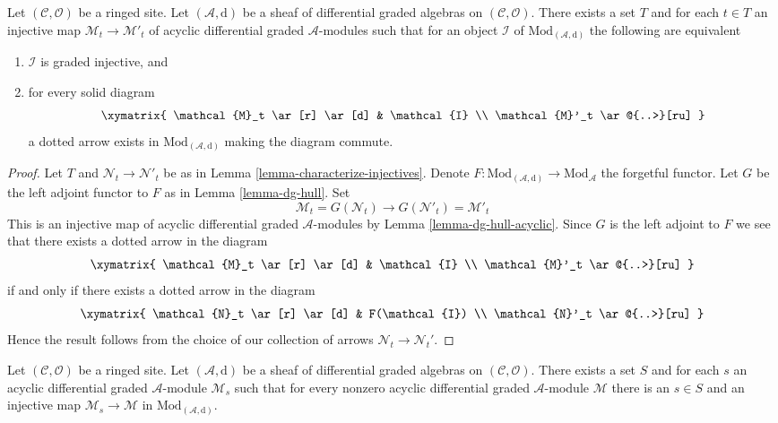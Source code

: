 \begin{lemma}
\label{lemma-characterize-graded-injectives-in-dg}
Let $(\mathcal{C}, \mathcal{O})$ be a ringed site.
Let $(\mathcal{A}, \text{d})$
be a sheaf of differential graded algebras on $(\mathcal{C}, \mathcal{O})$.
There exists a set $T$ and for each $t \in T$ an injective map
$\mathcal{M}_t \to \mathcal{M}'_t$ of
acyclic differential graded $\mathcal{A}$-modules
such that for an object $\mathcal{I}$ of $\text{Mod}_{(\mathcal{A}, \text{d})}$
the following are equivalent
\begin{enumerate}
\item $\mathcal{I}$ is graded injective, and
\item for every solid diagram
$$
\xymatrix{
\mathcal{M}_t \ar[r] \ar[d] & \mathcal{I} \\
\mathcal{M}'_t \ar@{..>}[ru]
}
$$
a dotted arrow exists in $\text{Mod}_{(\mathcal{A}, \text{d})}$
making the diagram commute.
\end{enumerate}
\end{lemma}

\begin{proof}
Let $T$ and $\mathcal{N}_t \to \mathcal{N}'_t$ be as in
Lemma \ref{lemma-characterize-injectives}.
Denote $F : \text{Mod}_{(\mathcal{A}, \text{d})} \to \text{Mod}_\mathcal{A}$
the forgetful functor.
Let $G$ be the left adjoint functor to
$F$ as in Lemma \ref{lemma-dg-hull}. Set
$$
\mathcal{M}_t = G(\mathcal{N}_t) \to
G(\mathcal{N}'_t) = \mathcal{M}'_t
$$
This is an injective map of acyclic differential graded
$\mathcal{A}$-modules by Lemma \ref{lemma-dg-hull-acyclic}.
Since $G$ is the left adjoint to $F$ we see that
there exists a dotted arrow in the diagram
$$
\xymatrix{
\mathcal{M}_t \ar[r] \ar[d] & \mathcal{I} \\
\mathcal{M}'_t \ar@{..>}[ru]
}
$$
if and only if there exists a dotted arrow in the diagram
$$
\xymatrix{
\mathcal{N}_t \ar[r] \ar[d] & F(\mathcal{I}) \\
\mathcal{N}'_t \ar@{..>}[ru]
}
$$
Hence the result follows from the choice of our
collection of arrows $\mathcal{N}_t \to \mathcal{N}_t'$.
\end{proof}


\begin{lemma}
\label{lemma-small-acyclics}
Let $(\mathcal{C}, \mathcal{O})$ be a ringed site.
Let $(\mathcal{A}, \text{d})$ be a sheaf of differential graded algebras
on $(\mathcal{C}, \mathcal{O})$. There exists a set $S$ and for each $s$
an acyclic differential graded $\mathcal{A}$-module $\mathcal{M}_s$ such
that for every nonzero acyclic differential graded $\mathcal{A}$-module
$\mathcal{M}$ there is an $s \in S$ and an injective map
$\mathcal{M}_s \to \mathcal{M}$ in $\text{Mod}_{(\mathcal{A}, \text{d})}$.
\end{lemma}

